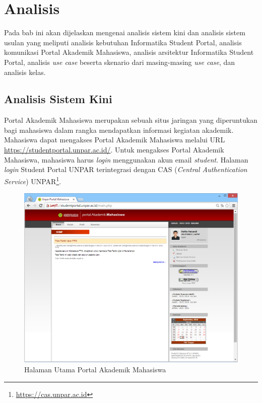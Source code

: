 \chapter{Analisis}
\label{chap:analisis}

Pada bab ini akan dijelaskan mengenai analisis sistem kini dan analisis sistem usulan yang meliputi analisis kebutuhan Informatika Student Portal, analisis komunikasi Portal Akademik Mahasiswa, analisis arsitektur Informatika Student Portal, analisis \textit{use case} beserta skenario dari masing-masing \textit{use case}, dan analisis kelas.

\section{Analisis Sistem Kini}
Portal Akademik Mahasiswa merupakan sebuah situs jaringan yang diperuntukan bagi mahasiswa dalam rangka mendapatkan informasi kegiatan akademik\cite{BTI:2012}. Mahasiswa dapat mengakses Portal Akademik Mahasiswa melalui URL \url{https://studentportal.unpar.ac.id/}. Untuk mengakses Portal Akademik Mahasiswa, mahasiswa harus \textit{login} menggunakan akun email \textit{student}. Halaman \textit{login} Student Portal UNPAR terintegrasi dengan CAS (\textit{Central Authentication Service}) UNPAR\footnote{\url{https://cas.unpar.ac.id}}.

\begin{figure}[H]
	\centering
	\includegraphics[scale=0.45]{Gambar/pam-home}
	\caption{Halaman Utama Portal Akademik Mahasiswa} 
	\label{fig:3_pam_home}
\end{figure}

